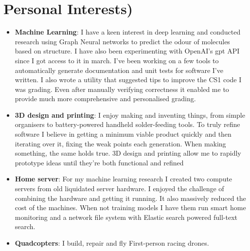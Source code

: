 \documentclass[letterpaper,12pt]{article}
\newcommand{\resumeSubHeadingListStart}{\begin{itemize}[leftmargin=*]}
\newcommand{\resumeSubHeadingListEnd}{\end{itemize}}
\begin{document}
\section{Personal Interests)}
  \resumeSubHeadingListStart
    \item{
      \textbf{Machine Learning}{: I have a keen interest in deep learning and conducted research using Graph Neural networks to predict the odour of molecules based on structure. 
I have also been experimenting with OpenAI's gpt API since I got access to it in march. I've been working on a few tools to automatically generate documentation and unit tests for software I've written. I also wrote a utility that suggested tips to improve the CS1 code I was grading. Even after manually verifying correctness it enabled me to provide much more comprehensive and personalised grading.}}
      \item{
      \textbf{3D design and printing}{: I enjoy making and inventing things, from simple organisers to battery-powered handheld solder-feeding tools. To truly refine software I believe in getting a minimum viable product quickly and then iterating over it, fixing the weak points each generation. When making something, the same holds true. 3D design and printing allow me to rapidly prototype ideas until they're both functional and refined} }
      \item{
      \textbf{Home server}{: For my machine learning research I created two compute servers from old liquidated server hardware. I enjoyed the challenge of combining the hardware and getting it running. It also massively reduced the cost of the machines. When not training models I have them run smart home monitoring and a network file system with Elastic search powered full-text search.}}
      \item{
      \textbf{Quadcopters}{: I build, repair and fly First-person racing drones. }}


  \resumeSubHeadingListEnd
\end{document}
